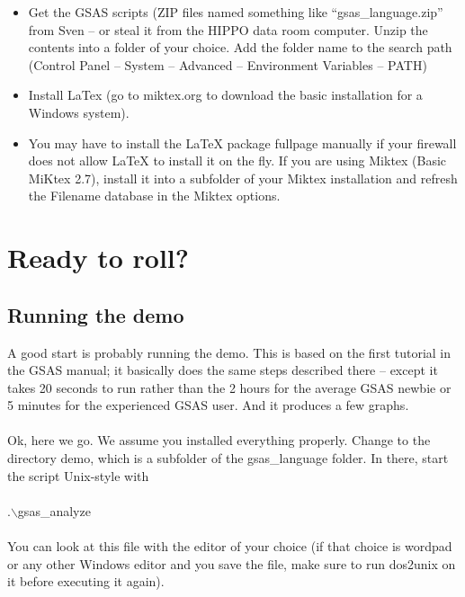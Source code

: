 \documentclass{article}
\begin{document}
\begin{itemize}
\item Get the GSAS scripts (ZIP files named something like
``gsas\_language.zip'' from Sven -- or steal it from the HIPPO data room computer. Unzip the contents into a folder of your choice.
 Add the folder name to the search path (Control Panel -- System -- Advanced
-- Environment Variables -- PATH)
\item Install LaTex (go to miktex.org to download the basic installation for a Windows system).
\item You may have to install the LaTeX package fullpage manually if your firewall does not allow LaTeX to install it on the fly. If you are using Miktex (Basic MiKtex 2.7), install it into a subfolder of your Miktex installation and refresh the Filename database in the Miktex options.
\end{itemize}

\section{Ready to roll?}

\subsection{Running the demo}
A good start is probably running the demo. This is based on the first tutorial in the GSAS manual; it basically does the same steps described there -- except it takes 20 seconds to run rather than the 2 hours for the average GSAS newbie or 5 minutes for the experienced GSAS user. And it produces a few graphs.\\ \\
Ok, here we go. We assume you installed everything properly. Change to the directory demo, which is a subfolder of the gsas\_language folder. In there, start the script Unix-style with\\ \\
.$\backslash$gsas\_analyze \\ \\
You can look at this file with the editor of your choice (if that choice is wordpad or any other Windows editor and you save the file, make sure to run dos2unix on it before executing it again). 
\end{document}
